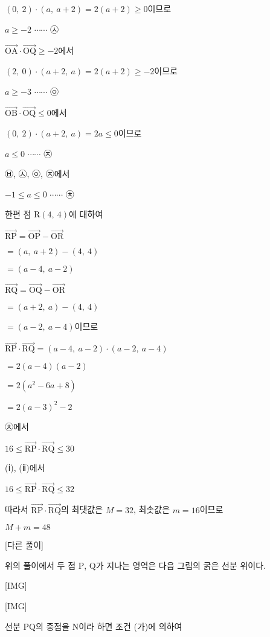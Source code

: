 \documentclass{oblivoir}
\begin{document}
$(0,\:2)\cdot(a,\: a+2)= 2(a+2)\ge 0$이므로 

$a\ge -2$ $\cdots\cdots$ ㉦

$\overrightarrow{\mathrm{OA}}\cdot\overrightarrow{\mathrm{OQ}}\ge -2$에서

$(2,\:  0)\cdot(a+2 ,\:  a)= 2(a+ 2)\ge - 2$이므로 

$a\ge -3$ $\cdots\cdots$ ㉧

$\overrightarrow{\mathrm{OB}}\cdot\overrightarrow{\mathrm{OQ}}\le 0$에서 

$(0,\:2)\cdot(a+2,\:  a)= 2a\le 0$이므로

$a\le 0$ $\cdots\cdots$ ㉨

㉥, ㉦, ㉧, ㉨에서 

$-1\le a\le 0$ $\cdots\cdots$ ㉩

한편 점 $\mathrm{R}(4,\: 4)$에 대하여

$\overrightarrow{\mathrm{RP}}$$=\overrightarrow{\mathrm{OP}} -\overrightarrow{\mathrm{OR}}$

$=(a,\:  a+2)-(4,\:  4)$

$=(a-4 ,\:  a -2)$

$\overrightarrow{\mathrm{RQ}}$$=\overrightarrow{\mathrm{OQ}} -\overrightarrow{\mathrm{OR}}$

$=(a+2 ,\:  a)-(4,\:  4)$

$=(a-2 ,\:  a -4)$이므로

$\overrightarrow{\mathrm{RP}}\cdot\overrightarrow{\mathrm{RQ}}$$=(a-4 ,\:  a -2)\cdot(a-2,\:  a-4)$

$= 2(a-4)(a-2)$

$= 2\left(a^{2}- 6a + 8\right)$

$= 2(a-3)^{2}-2$

㉩에서 

$16\le\overrightarrow{\mathrm{RP}}\cdot\overrightarrow{\mathrm{RQ}}\le 30$

(ⅰ), (ⅱ)에서

$16\le\overrightarrow{\mathrm{RP}}\cdot\overrightarrow{\mathrm{RQ}}\le 32$

따라서 $\overrightarrow{\mathrm{RP}}\cdot\overrightarrow{\mathrm{RQ}}$의 최댓값은 $M = 32$, 최솟값은 $m = 16$이므로 

$M + m = 48$

[다른 풀이]

위의 풀이에서 두 점 $\mathrm{P}$, $\mathrm{Q}$가 지나는 영역은 다음 그림의 굵은 선분 위이다.

[IMG]

[IMG]

선분 $\mathrm{PQ}$의 중점을 $\mathrm{N}$이라 하면 조건 (가)에 의하여
\end{document}
